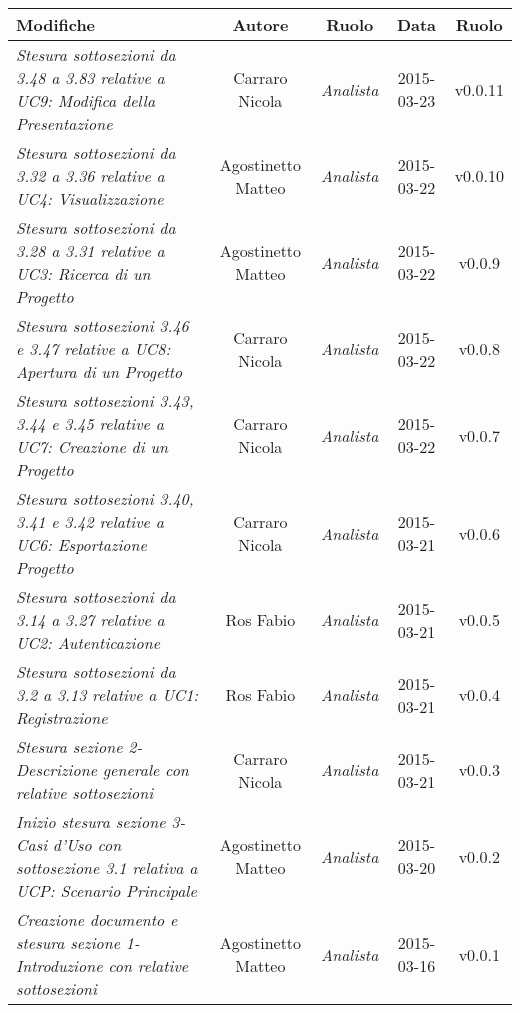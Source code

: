 \newpage
\begin{table}[h]
\centering
\begin{tabular}{|p{}|c|c|c|c|}
	\toprule
		\textbf{Modifiche} & \textbf{Autore} & \textbf{Ruolo} & \textbf{Data} & \textbf{Ruolo} \\
	\midrule
	\midrule
		\textit{Stesura sottosezioni da 3.48 a 3.83 relative a UC9: Modifica della Presentazione} & Carraro Nicola & \textit{Analista} & 2015-03-23 & v0.0.11 \\
	\midrule
		\textit{Stesura sottosezioni da 3.32 a 3.36 relative a UC4: Visualizzazione} & Agostinetto Matteo & \textit{Analista} & 2015-03-22 & v0.0.10 \\
	\midrule
		\textit{Stesura sottosezioni da 3.28 a 3.31 relative a UC3: Ricerca di un Progetto} & Agostinetto Matteo & \textit{Analista} & 2015-03-22 & v0.0.9 \\
	\midrule
		\textit{Stesura sottosezioni 3.46 e 3.47 relative a UC8: Apertura di un Progetto} & Carraro Nicola & \textit{Analista} & 2015-03-22 & v0.0.8 \\
	\midrule
		\textit{Stesura sottosezioni 3.43, 3.44 e 3.45 relative a UC7: Creazione di un Progetto} & Carraro Nicola & \textit{Analista} & 2015-03-22 & v0.0.7 \\
	\midrule
		\textit{Stesura sottosezioni 3.40, 3.41 e 3.42 relative a UC6: Esportazione Progetto} & Carraro Nicola & \textit{Analista} & 2015-03-21 & v0.0.6 \\
	\midrule
		\textit{Stesura sottosezioni da 3.14 a 3.27 relative a UC2: Autenticazione} & Ros Fabio & \textit{Analista} & 2015-03-21 & v0.0.5 \\
	\midrule
		\textit{Stesura sottosezioni da 3.2 a 3.13 relative a UC1: Registrazione} & Ros Fabio & \textit{Analista} & 2015-03-21 & v0.0.4 \\
	\midrule
		\textit{Stesura sezione 2-Descrizione generale con relative sottosezioni} & Carraro Nicola & \textit{Analista} & 2015-03-21 & v0.0.3 \\
	\midrule
		\textit{Inizio stesura sezione 3-Casi d'Uso con sottosezione 3.1 relativa a UCP: Scenario Principale} & Agostinetto Matteo & \textit{Analista} & 2015-03-20 & v0.0.2 \\ 
	\midrule
		\textit{Creazione documento e stesura sezione 1-Introduzione con relative sottosezioni} & Agostinetto Matteo & \textit{Analista} & 2015-03-16 & v0.0.1 \\
	\bottomrule
\end{tabular}	
\end{table}
\newpage